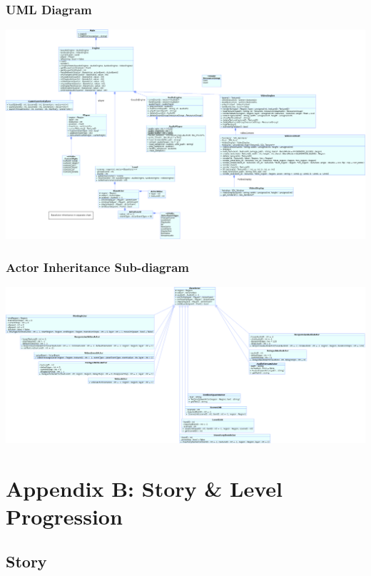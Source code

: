 \documentclass{article}
\begin{document}
		\subsubsection{UML Diagram}
			\begin{center}
				\includegraphics[scale=0.30]{MainClasses}
			\end{center}
		\subsubsection{Actor Inheritance Sub-diagram}
			\begin{center}
				\includegraphics[scale=0.35]{Actors}
			\end{center}
\section{Appendix B: Story \& Level Progression}
	\subsection{Story}
\end{document}
